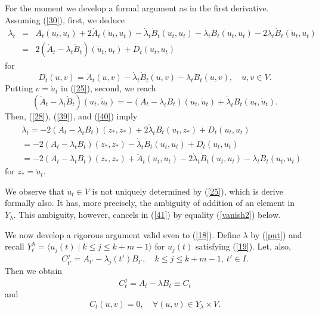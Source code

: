 \documentclass[final,a4paper]{jmsj}
\theoremstyle{thmstyleone}%
\theoremstyle{thmstyletwo}%
\theoremstyle{thmstylethree}%
\begin{document}
For the moment we develop a formal argument as in the first derivative. Assuming (\ref{30}), first, we deduce  
\begin{eqnarray} 
\ddot\lambda_t & = & \ddot A_t(u_t, u_t)+2\dot A_t(\dot u_t, u_t)-\dot \lambda_t\dot B_t(u_t,u_t)-\lambda_t\ddot B_t(u_t, u_t)-2\lambda_t\dot B_t(\dot u_t, u_t) \nonumber\\ 
& = & 2(\dot A_t-\lambda_t\dot B_t)(\dot u_t, u_t)+D_t(u_t, u_t) 
 \label{39} 
\end{eqnarray} 
for  
\begin{equation} 
D_t(u,v)=\ddot A_t(u,v)-\dot \lambda_t\dot B_t(u,v)-\lambda_t\ddot B_t(u,v), \quad u, v\in V. 
 \label{dt}
\end{equation} 
Putting $v=\dot u_t$ in (\ref{25}), second, we reach 
\begin{equation} 
(\dot A_t-\lambda_t\dot B_t)(u_t, \dot u_t)=-(A_t-\lambda_tB_t)(\dot u_t, \dot u_t)+\dot\lambda_tB_t(u_t, \dot u_t). 
 \label{40}
\end{equation} 
Then, (\ref{28}), (\ref{39}), and (\ref{40}) imply 
\begin{eqnarray} 
& & \ddot \lambda_t = -2(A_t-\lambda_tB_t)(z_\ast, z_\ast)+2\dot \lambda_tB_t(u_t,z_\ast)+D_t(u_t, u_t) \nonumber\\ 
& & = -2(A_t-\lambda_tB_t)(z_\ast, z_\ast)-\dot\lambda_t\dot B_t(u_t, u_t)+D_t(u_t, u_t) \nonumber\\ 
& & = -2(A_t-\lambda_tB_t)(z_\ast, z_\ast)+\ddot A_t(u_t, u_t)-2\dot \lambda_t\dot B_t(u_t,u_t)-\lambda_t\ddot B_t(u_t, u_t)  
 \label{41} 
\end{eqnarray} 
for $z_\ast=\dot u_t$. 

We observe that $\dot u_t\in V$ is not uniquely determined by (\ref{25}), which is derive formally also. It has, more precisely, the ambiguity of addition of an element in $Y_\lambda$. This ambiguity, however, cancels in  (\ref{41}) by equality  (\ref{vanish2}) below. 

We now develop a rigorous argument valid even to (\ref{18}). Define $\lambda$ by (\ref{put}) and recall $Y_t^\lambda=\langle u_j(t) \mid k\leq j\leq k+m-1\rangle$ for $u_j(t)$ satisfying (\ref{19}). Let, also, 
\[ C_{t'}^j=A_{t'}-\lambda_j(t')B_{t'}, \quad k\leq j\leq k+m-1, \ t'\in I. \] 
Then we obtain 
\[ C_t^j=A_t-\lambda B_t\equiv C_t \] 
and    
\begin{equation} 
C_t(u,v)=0, \quad \forall (u,v) \in Y_\lambda\times V.   
 \label{vanish2}
\end{equation} 
\end{document}
